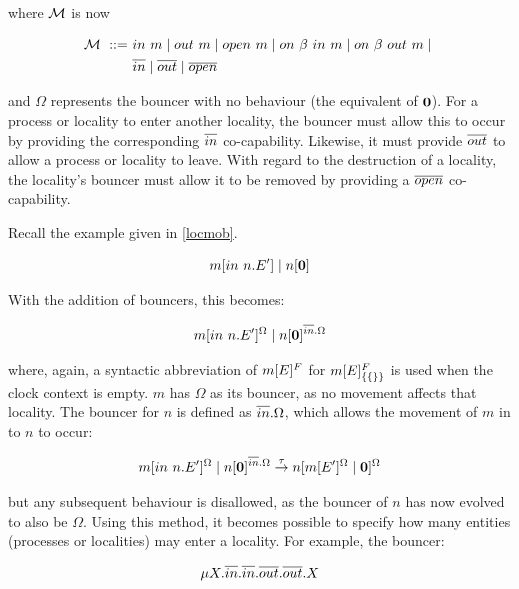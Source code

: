 \noindent where $\text{$\mathcal{M}$}$ is now

\begin{equation}
  \begin{aligned}
    \text{$\mathcal{M}$}\ ::=\ & in\ m \;|\; out\ m \;|\; open\ m \;|\;
     on\ \beta\ in\ m \;|\;  
   on\ \beta\ out\ m \;|\; \\ & \overline{in} \;|\;
   \overline{out} \;|\; \overline{open}
   \end{aligned}
\end{equation}

\noindent and $\Omega$ represents the bouncer with no behaviour (the
equivalent of $\textbf{0}$).  For a process or locality to enter another
locality, the bouncer must allow this to occur by providing the
corresponding $\overline{in}$ co-capability.  Likewise, it must provide $\overline{out}$
to allow a process or locality to leave.  With regard to the destruction
of a locality, the locality's bouncer must allow it to be removed by
providing a $\overline{open}$ co-capability.

Recall the example given in \ref{locmob}.

\begin{equation}
{m}[ in\ n.E^\prime ]\;|\;{n}[ \textbf{0} ]
\end{equation}

\noindent With the addition of bouncers, this becomes:

\begin{equation}
{m}[ in\ n.E^\prime ]^{\Omega}\;|\;{n}[ \textbf{0} ]^{\overline{in}.\Omega}
\end{equation}

\noindent where, again, a syntactic abbreviation of ${m}[ E ]^{F}$ for
${m}[ E ]^{F}_{\{\{\}\}}$ is used when the clock context is empty. $m$ has
$\Omega$ as its bouncer, as no movement affects that locality.  The
bouncer for $n$ is defined as $\overline{in}.\Omega$, which allows the movement
of $m$ in to $n$ to occur:

\begin{equation}
{m}[ in\ n.E^\prime ]^{\Omega}\;|\;{n}[ \textbf{0} ]^{\overline{in}.\Omega}
 \stackrel{\tau}{\rightarrow}
{n}[ {m}[ E^\prime ]^{\Omega} \;|\; \textbf{0} ]^{\Omega}
\end{equation}

\noindent but any subsequent behaviour is disallowed, as the bouncer of
$n$ has now evolved to also be $\Omega$.  Using this method, it becomes
possible to specify how many entities (processes or localities) may
enter a locality.  For example, the bouncer:

\begin{equation}
\mu X.\overline{in}.\overline{in}.\overline{out}.\overline{out}.X
\end{equation}

